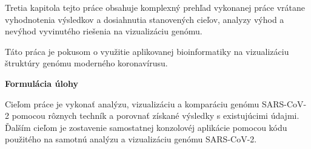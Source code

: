 Tretia kapitola tejto práce obsahuje komplexný prehľad vykonanej práce vrátane vyhodnotenia výsledkov a dosiahnutia stanovených cieľov, analyzy výhod a nevýhod vyvinutého riešenia na vizualizáciu genómu.

Táto práca je pokusom o využitie aplikovanej bioinformatiky na vizualizáciu štruktúry genómu moderného koronavírusu.

\bigskip
\bigskip

{\noindent\LARGE{\textbf{Formulácia úlohy}}}

\smallskip
\smallskip

Cieľom práce je vykonať analýzu, vizualizáciu a komparáciu genómu SARS-CoV-2 pomocou rôznych techník a porovnať získané výsledky s existujúcimi údajmi.
Ďalším cieľom je zostavenie samostatnej konzolovéj aplikácie pomocou kódu použitého na samotnú analýzu a vizualizáciu genómu SARS-CoV-2.